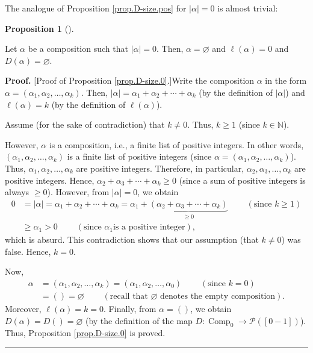 \documentclass[numbers=enddot,12pt,final,onecolumn,notitlepage]{scrartcl}%
\theoremstyle{definition}
\newtheorem{prop}[theo]{Proposition}
\newenvironment{proposition}[1][]
{\begin{prop}[#1]\begin{leftbar}}
{\end{leftbar}\end{prop}}
\newenvironment{proof}[1][Proof]{\noindent\textbf{#1.} }{\ \rule{0.5em}{0.5em}}
\begin{document}
The analogue of Proposition \ref{prop.D-size.pos} for $\left\vert
\alpha\right\vert =0$ is almost trivial:

\begin{proposition}
\label{prop.D-size.0}Let $\alpha$ be a composition such that $\left\vert
\alpha\right\vert =0$. Then, $\alpha=\varnothing$ and $\ell\left(
\alpha\right)  =0$ and $D\left(  \alpha\right)  =\varnothing$.
\end{proposition}

\begin{proof}
[Proof of Proposition \ref{prop.D-size.0}.]Write the composition $\alpha$ in
the form $\alpha=\left(  \alpha_{1},\alpha_{2},\ldots,\alpha_{k}\right)  $.
Then, $\left\vert \alpha\right\vert =\alpha_{1}+\alpha_{2}+\cdots+\alpha_{k}$
(by the definition of $\left\vert \alpha\right\vert $) and $\ell\left(
\alpha\right)  =k$ (by the definition of $\ell\left(  \alpha\right)  $).

Assume (for the sake of contradiction) that $k\neq0$. Thus, $k\geq1$ (since
$k\in\mathbb{N}$).

However, $\alpha$ is a composition, i.e., a finite list of positive integers.
In other words, $\left(  \alpha_{1},\alpha_{2},\ldots,\alpha_{k}\right)  $ is
a finite list of positive integers (since $\alpha=\left(  \alpha_{1}%
,\alpha_{2},\ldots,\alpha_{k}\right)  $). Thus, $\alpha_{1},\alpha_{2}%
,\ldots,\alpha_{k}$ are positive integers. Therefore, in particular,
$\alpha_{2},\alpha_{3},\ldots,\alpha_{k}$ are positive integers. Hence,
$\alpha_{2}+\alpha_{3}+\cdots+\alpha_{k}\geq0$ (since a sum of positive
integers is always $\geq0$). However, from $\left\vert \alpha\right\vert =0$,
we obtain%
\begin{align*}
0  &  =\left\vert \alpha\right\vert =\alpha_{1}+\alpha_{2}+\cdots+\alpha
_{k}=\alpha_{1}+\underbrace{\left(  \alpha_{2}+\alpha_{3}+\cdots+\alpha
_{k}\right)  }_{\geq0}\ \ \ \ \ \ \ \ \ \ \left(  \text{since }k\geq1\right)
\\
&  \geq\alpha_{1}>0\ \ \ \ \ \ \ \ \ \ \left(  \text{since }\alpha_{1}\text{
is a positive integer}\right)  ,
\end{align*}
which is absurd. This contradiction shows that our assumption (that $k\neq0$)
was false. Hence, $k=0$.

Now,
\begin{align*}
\alpha &  =\left(  \alpha_{1},\alpha_{2},\ldots,\alpha_{k}\right)  =\left(
\alpha_{1},\alpha_{2},\ldots,\alpha_{0}\right)  \ \ \ \ \ \ \ \ \ \ \left(
\text{since }k=0\right) \\
&  =\left(  {}\right)  =\varnothing\ \ \ \ \ \ \ \ \ \ \left(  \text{recall
that }\varnothing\text{ denotes the empty composition}\right)  .
\end{align*}
Moreover, $\ell\left(  \alpha\right)  =k=0$. Finally, from $\alpha=\left(
{}\right)  $, we obtain $D\left(  \alpha\right)  =D\left(  {}\right)
=\varnothing$ (by the definition of the map $D:\operatorname*{Comp}%
\nolimits_{0}\rightarrow\mathcal{P}\left(  \left[  0-1\right]  \right)  $).
Thus, Proposition \ref{prop.D-size.0} is proved.
\end{proof}
\end{document}
